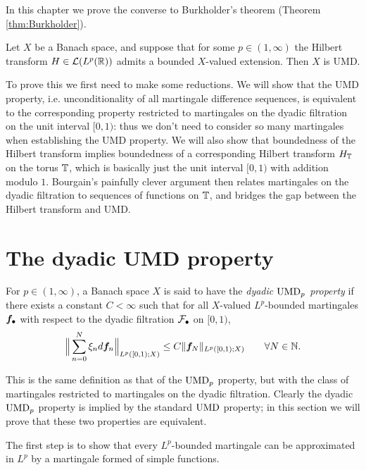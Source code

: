 In this chapter we prove the converse to Burkholder's theorem (Theorem \ref{thm:Burkholder}).

\begin{thm}[Bourgain]\label{thm:Bourgain}
  Let $X$ be a Banach space, and suppose that for some $p \in (1,\infty)$ the Hilbert transform $H \in \mathcal{L}(L^p(\mathbb{R}))$ admits a bounded $X$-valued extension.
  Then $X$ is UMD.
\end{thm}

To prove this we first need to make some reductions.
We will show that the UMD property, i.e. unconditionality of all martingale difference sequences, is equivalent to the corresponding property restricted to martingales on the dyadic filtration on the unit interval $[0,1)$: thus we don't need to consider so many martingales when establishing the UMD property.
We will also show that boundedness of the Hilbert transform implies boundedness of a corresponding Hilbert transform $H_{\mathbb{T}}$ on the torus $\mathbb{T}$, which is basically just the unit interval $[0,1)$ with addition modulo $1$.
Bourgain's painfully clever argument then relates martingales on the dyadic filtration to sequences of functions on $\mathbb{T}$, and bridges the gap between the Hilbert transform and UMD.

\section{The dyadic UMD property}


\begin{defn}
  For $p \in (1,\infty)$, a Banach space $X$ is said to have the \emph{dyadic $\mathrm{UMD}_{p}$ property} if there exists a constant $C < \infty$ such that for all $X$-valued $L^p$-bounded martingales $\bm{f}_{\bullet}$ with respect to the dyadic filtration $\mathcal{F}_{\bullet}$ on $[0,1)$,
  \begin{equation}\label{eq:dyadic-UMD-property}
    \Big\| \sum_{n=0}^{N} \xi_{n} d\bm{f}_{n} \Big\|_{L^p([0,1);X)} \leq C \| \bm{f}_{N}\|_{L^p([0,1);X)} \qquad \forall N \in \mathbb{N}.
  \end{equation}
\end{defn}

This is the same definition as that of the $\mathrm{UMD}_{p}$ property, but with the class of martingales restricted to martingales on the dyadic filtration.
Clearly the dyadic $\mathrm{UMD}_{p}$ property is implied by the standard $\mathrm{UMD}$ property; in this section we will prove that these two properties are equivalent.

The first step is to show that every $L^p$-bounded martingale can be approximated in $L^p$ by a martingale formed of simple functions.

